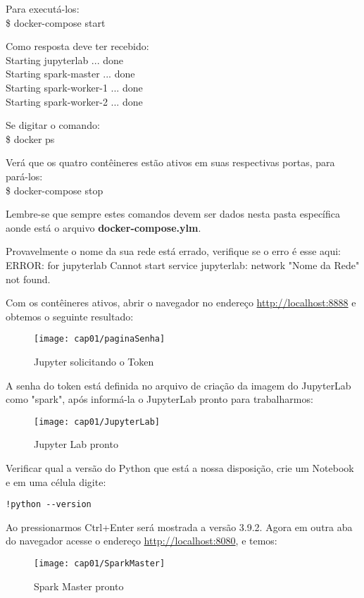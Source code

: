 Para executá-los: \\
{\ttfamily\$ docker-compose start}

Como resposta deve ter recebido: \\
{\ttfamily Starting jupyterlab     ... done \\
Starting spark-master   ... done \\
Starting spark-worker-1 ... done \\
Starting spark-worker-2 ... done}

Se digitar o comando: \\
{\ttfamily\$ docker ps}

Verá que os quatro contêineres estão ativos em suas respectivas portas, para pará-los: \\
{\ttfamily\$ docker-compose stop}

Lembre-se que sempre estes comandos devem ser dados nesta pasta específica aonde está o arquivo \textbf{docker-compose.ylm}.

\begin{note} 
	Provavelmente o nome da sua rede está errado, verifique se o erro é esse aqui: ERROR: for jupyterlab  Cannot start service jupyterlab: network "Nome da Rede" not found.
\end{note}
 
Com os contêineres ativos, abrir o navegador no endereço \url{http://localhost:8888} e obtemos o seguinte resultado:
\begin{figure}[H]
	\centering\texttt{[image: cap01/paginaSenha]}
	\caption{Jupyter solicitando o Token}
\end{figure}

A senha do token está definida no arquivo de criação da imagem do JupyterLab como "spark", após informá-la o JupyterLab pronto para trabalharmos:
\begin{figure}[H]
	\centering\texttt{[image: cap01/JupyterLab]}
	\caption{Jupyter Lab pronto}
\end{figure}

Verificar qual a versão do Python que está a nossa disposição, crie um Notebook e em uma célula digite:
\begin{lstlisting}[]
!python --version
\end{lstlisting}

Ao pressionarmos Ctrl+Enter será mostrada a versão 3.9.2. Agora em outra aba do navegador acesse o endereço \url{http://localhost:8080}, e temos:
\begin{figure}[H]
	\centering\texttt{[image: cap01/SparkMaster]}
	\caption{Spark Master pronto}
\end{figure}


